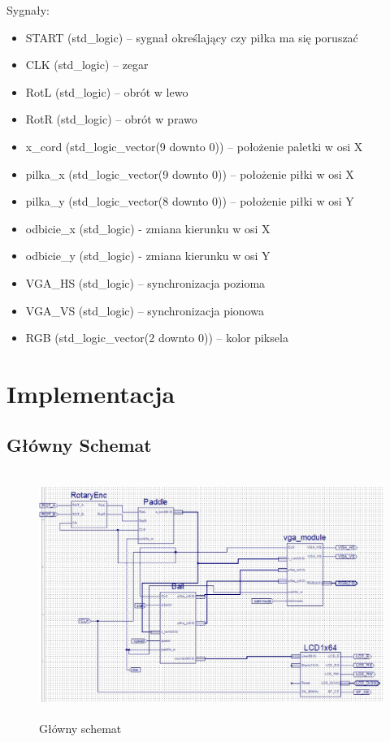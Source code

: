 \documentclass[12pt,a4paper]{article}
\begin{document}
Sygnały:
\begin{itemize}
\item START (std\_logic) – sygnał określający czy piłka ma się poruszać
\item CLK (std\_logic) – zegar
\item RotL (std\_logic) – obrót w lewo
\item RotR (std\_logic) – obrót w prawo
\item x\_cord (std\_logic\_vector(9 downto 0)) – położenie paletki w osi X
\item pilka\_x (std\_logic\_vector(9 downto 0)) – położenie piłki w osi X
\item pilka\_y (std\_logic\_vector(8 downto 0)) – położenie piłki w osi Y
\item odbicie\_x (std\_logic) - zmiana kierunku w osi X
\item odbicie\_y (std\_logic) - zmiana kierunku w osi Y
\item VGA\_HS (std\_logic) – synchronizacja pozioma
\item VGA\_VS (std\_logic) – synchronizacja pionowa
\item RGB (std\_logic\_vector(2 downto 0)) – kolor piksela

\end{itemize}
\newpage

\section{Implementacja}
\subsection{Główny Schemat}
\begin{figure}[ht]
    \centering
    \includegraphics[height=8cm]{schemat2.JPG}  
    \caption{Główny schemat}
    \label{fig:my_label}
\end{figure}
\end{document}
